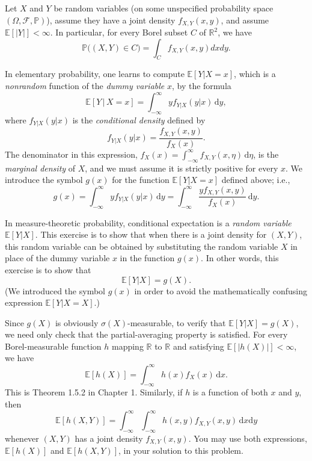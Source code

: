 \documentclass[11pt]{article}
\newcommand\E{\mathbb{E}}
\newcommand\R{\mathbb{R}}
\renewcommand\P{\mathbb{P}} %
\newcommand\cF{\mathcal{F}}
\newcounter{question}[section]
\begin{document}
    \begin{hwquestion}
        Let $X$ and $Y$ be random variables (on some unspecified probability space $(\Omega,
        \cF, \P)$), assume they have a joint density $f_{X,Y}(x,y)$, and assume $\E[|Y|] <
        \infty$. In particular, for every Borel subset $C$ of $\R^2$, we have
        \[
            \P\big( (X, Y) \in C \big)
            =
            \int_{C} f_{X,Y}(x, y) dx dy.
        \]

        In elementary probability, one learns to compute $\E[Y | X = x]$, which is a
        \emph{nonrandom} function of the \emph{dummy variable} $x$, by the formula
        \[
            \E[Y \, | \, X = x]
            =
            \int_{-\infty}^{\infty}
            y
            f_{Y | X}(y | x)
            \, \text{d} y,
        \]
        where $f_{Y|X}(y|x)$ is the \emph{conditional density} defined by
        \[
            f_{Y|X}(y|x)
            =
            \frac{f_{X,Y}(x, y)}{f_{X}(x)}.
        \]
        The denominator in this expression, $f_{X}(x) = \int_{-\infty}^{\infty} f_{X,Y}(
        x, \eta) \, \text{d} \eta$, is the \emph{marginal density} of $X$, and we must
        assume it is strictly positive for every $x$. We introduce the symbol $g(x)$ for the
        function $\E[Y | X = x]$ defined above; i.e.,
        \[
            g(x)
            =
            \int_{-\infty}^{\infty}
            y
            f_{Y | X}(y | x)
            \, \text{d} y
            =
            \int_{-\infty}^{\infty}
            \frac{
                y f_{X,Y}(x, y)
            }{
                f_X(x)
            }
            \, \text{d} y.
        \]

        In measure-theoretic probability, conditional expectation is a \emph{random
        variable} $\E[Y | X]$. This exercise is to show that when there is a joint density
        for $(X, Y)$, this random variable can be obtained by substituting the random
        variable $X$ in place of the dummy variable $x$ in the function $g(x)$. In other
        words, this exercise is to show that
        \[
            \E[Y | X]
            =
            g(X).
        \]
        (We introduced the symbol $g(x)$ in order to avoid the mathematically confusing
        expression $\E[Y | X = X]$.)

        Since $g(X)$ is obviously $\sigma(X)$-measurable, to verify that $\E[Y|X] = g(X)$,
        we need only check that the partial-averaging property is satisfied. For every
        Borel-measurable function $h$ mapping $\R$ to $\R$ and satisfying $\E[|h(X)|] <
        \infty$, we have
        \[
            \E[ h(X) ]
            =
            \int_{-\infty}^{\infty}
            h(x) f_X(x)
            \, \text{d} x.
        \]
        This is Theorem 1.5.2 in Chapter 1. Similarly, if $h$ is a function of both $x$ and
        $y$, then
        \[
            \E[ h(X, Y) ]
            =
            \int_{-\infty}^{\infty}
            \int_{-\infty}^{\infty}
            h(x, y)
            f_{X,Y}(x, y) \, \text{d} x \text{d} y
        \]
        whenever $(X, Y)$ has a joint density $f_{X, Y}(x, y)$. You may use both
        expressions, $\E[h(X)]$ and $\E[h(X, Y)]$, in your solution to this problem.


\end{hwquestion}
\end{document}
